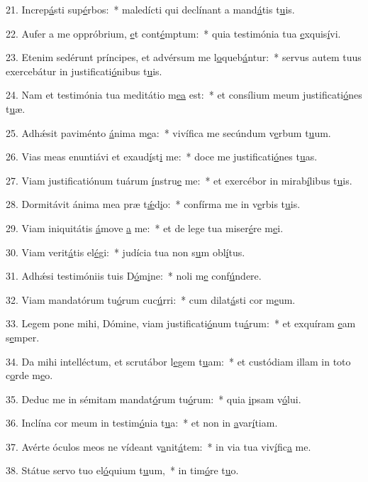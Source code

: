 21. Increp\uline{á}sti sup\uline{é}rbos:~* maledícti qui declínant a mand\uline{á}tis t\uline{u}is.\par 
22. Aufer a me oppróbrium, \uline{e}t cont\uline{é}mptum:~* quia testimónia tua \uline{e}xquis\uline{í}vi.\par 
23. Etenim sedérunt príncipes, et advérsum me l\uline{o}queb\uline{á}ntur:~* servus autem tuus exercebátur in justificati\uline{ó}nibus t\uline{u}is.\par 
24. Nam et testimónia tua meditátio m\uline{e}\uline{a} est:~* et consílium meum justificati\uline{ó}nes t\uline{u}æ.\par 
25. Adhǽsit paviménto \uline{á}nima m\uline{e}a:~* vivífica me secúndum v\uline{e}rbum t\uline{u}um.\par 
26. Vias meas enuntiávi et exaud\uline{í}st\uline{i} me:~* doce me justificati\uline{ó}nes t\uline{u}as.\par 
27. Viam justificatiónum tuárum \uline{í}nstru\uline{e} me:~* et exercébor in mirab\uline{í}libus t\uline{u}is.\par 
28. Dormitávit ánima mea præ t\uline{ǽ}d\uline{i}o:~* confírma me in v\uline{e}rbis t\uline{u}is.\par 
29. Viam iniquitátis \uline{á}move \uline{a} me:~* et de lege tua miser\uline{é}re m\uline{e}i.\par 
30. Viam verit\uline{á}tis el\uline{é}gi:~* judícia tua non s\uline{u}m obl\uline{í}tus.\par 
31. Adhǽsi testimóniis tuis D\uline{ó}m\uline{i}ne:~* noli m\uline{e} conf\uline{ú}ndere.\par 
32. Viam mandatórum tu\uline{ó}rum cuc\uline{ú}rri:~* cum dilat\uline{á}sti cor m\uline{e}um.\par 
33. Legem pone mihi, Dómine, viam justificati\uline{ó}num tu\uline{á}rum:~* et exquíram \uline{e}am s\uline{e}mper.\par 
34. Da mihi intelléctum, et scrutábor l\uline{e}gem t\uline{u}am:~* et custódiam illam in toto c\uline{o}rde m\uline{e}o.\par 
35. Deduc me in sémitam mandat\uline{ó}rum tu\uline{ó}rum:~* quia \uline{i}psam v\uline{ó}lui.\par 
36. Inclína cor meum in testim\uline{ó}nia t\uline{u}a:~* et non in \uline{a}var\uline{í}tiam.\par 
37. Avérte óculos meos ne vídeant v\uline{a}nit\uline{á}tem:~* in via tua viv\uline{í}fic\uline{a} me.\par 
38. Státue servo tuo el\uline{ó}quium t\uline{u}um,~* in tim\uline{ó}re t\uline{u}o.\par 
